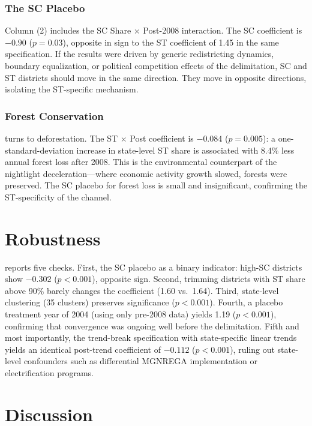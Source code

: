 \documentclass[12pt]{article}
\begin{document}
\subsubsection*{The SC Placebo} Column (2) includes the SC Share $\times$ Post-2008 interaction. The SC coefficient is $-0.90$ ($p = 0.03$), opposite in sign to the ST coefficient of 1.45 in the same specification. If the results were driven by generic redistricting dynamics, boundary equalization, or political competition effects of the delimitation, SC and ST districts should move in the same direction. They move in opposite directions, isolating the ST-specific mechanism.

\subsubsection*{Forest Conservation}  turns to deforestation. The ST $\times$ Post coefficient is $-0.084$ ($p = 0.005$): a one-standard-deviation increase in state-level ST share is associated with 8.4\% less annual forest loss after 2008. This is the environmental counterpart of the nightlight deceleration---where economic activity growth slowed, forests were preserved. The SC placebo for forest loss is small and insignificant, confirming the ST-specificity of the channel.


\section{Robustness}\label{sec:robustness}

 reports five checks. First, the SC placebo as a binary indicator: high-SC districts show $-0.302$ ($p < 0.001$), opposite sign. Second, trimming districts with ST share above 90\% barely changes the coefficient (1.60 vs.\ 1.64). Third, state-level clustering (35 clusters) preserves significance ($p < 0.001$). Fourth, a placebo treatment year of 2004 (using only pre-2008 data) yields 1.19 ($p < 0.001$), confirming that convergence was ongoing well before the delimitation. Fifth and most importantly, the trend-break specification with state-specific linear trends yields an identical post-trend coefficient of $-0.112$ ($p < 0.001$), ruling out state-level confounders such as differential MGNREGA implementation or electrification programs.


\section{Discussion}\label{sec:discussion}
\end{document}
